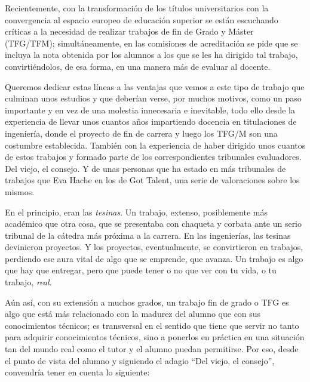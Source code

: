 
Recientemente, con la transformación de los títulos universitarios con
la convergencia al espacio europeo de educación superior se están
escuchando críticas a la necesidad de realizar trabajos de fin de
Grado y Máster (TFG/TFM); simultáneamente, en las comisiones de acreditación se
pide que se incluya la nota obtenida por los alumnos a los que se les
ha dirigido tal trabajo, convirtiéndolos, de esa forma, en una manera
más de evaluar al docente. 

Queremos dedicar estas líneas a las ventajas que vemos a este tipo de
trabajo que culminan unos estudios y que deberían verse, por muchos
motivos, como un paso importante y en vez de una molestia innecesaria
e inevitable, todo ello desde la experiencia de llevar unos cuantos
años impartiendo docencia en titulaciones de ingeniería, donde el
proyecto de fin de carrera y luego los TFG/M son una
costumbre establecida. También con la experiencia de haber dirigido
unos cuantos de estos trabajos y formado parte de los correspondientes
tribunales evaluadores. Del viejo, el consejo. Y de unas personas que ha
estado en más tribunales de trabajos que Eva Hache en los de Got
Talent, una serie de valoraciones sobre los mismos. 

En el principio, eran las {\em tesinas}. Un trabajo, extenso,
posiblemente más académico que otra cosa, que se presentaba con
chaqueta y corbata ante un serio tribunal de la cátedra más próxima a
la carrera. En las ingenierías, las tesinas devinieron
proyectos. %
 Y los proyectos, eventualmente, se convirtieron en trabajos,
 perdiendo ese aura vital de algo que se emprende, que avanza. Un
 trabajo es algo que hay que entregar, pero que puede tener o no que
 ver con tu vida, o tu trabajo, {\em real}. 

Aún así, con su extensión a muchos grados, un trabajo fin de grado o
TFG es algo que está más relacionado con la madurez del alumno que con
sus conocimientos técnicos; es transversal en el sentido que tiene que
servir no tanto para adquirir conocimientos técnicos, sino a ponerlos
en práctica en una situación tan del mundo real como el tutor y el
alumno puedan permitirse.  Por eso, desde el punto de vista del
alumno y siguiendo el adagio ``Del viejo, el consejo'', convendría
tener en cuenta lo siguiente:

